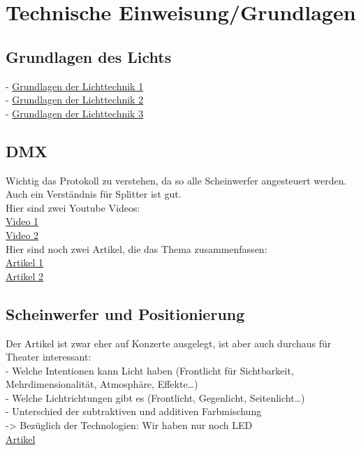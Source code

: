 \section{Technische Einweisung/Grundlagen}
\subsection{Grundlagen des Lichts}
- \href{https://www.bonedo.de/artikel/crashkurs-grundlagen-der-lichttechnik-1/}{Grundlagen der Lichttechnik 1} \\
- \href{https://www.bonedo.de/artikel/crashkurs-grundlagen-der-lichttechnik-2/}{Grundlagen der Lichttechnik 2} \\
- \href{https://www.bonedo.de/artikel/crashkurs-grundlagen-der-lichttechnik-3/}{Grundlagen der Lichttechnik 3} 

\subsection{DMX}
Wichtig das Protokoll zu verstehen, da so alle Scheinwerfer angesteuert werden. Auch ein Verständnis für Splitter ist gut.\\
Hier sind zwei Youtube Videos: \\
\href{https://youtu.be/w8TdsO8vqgo?feature=shared}{Video 1}\\
\href{https://youtu.be/GMMHAhFN6LQ}{Video 2}\\

\noindent Hier sind noch zwei Artikel, die das Thema zusammenfassen:\\
\href{https://www.stage223.com/wissen/dmx-grundlagen-workshop-wie-funktioniert-dmx/
}{Artikel 1}\\
\href{https://www.delamar.de/eventtechnik/dmx-steuerung-54218/}{Artikel 2}

\subsection{Scheinwerfer und Positionierung}
Der Artikel ist zwar eher auf Konzerte ausgelegt, ist aber auch durchaus für Theater interessant: \\
- Welche Intentionen kann Licht haben (Frontlicht für Sichtbarkeit, Mehrdimensionalität, Atmosphäre, Effekte…)\\
- Welche Lichtrichtungen gibt es (Frontlicht, Gegenlicht, Seitenlicht…)\\
- Unterschied der subtraktiven und additiven Farbmischung \\
-> Bezüglich der Technologien: Wir haben nur noch LED\\
\href{https://www.stageaid.de/komponenten-einer-lichtanlage-grundlagen/}{Artikel} \\

